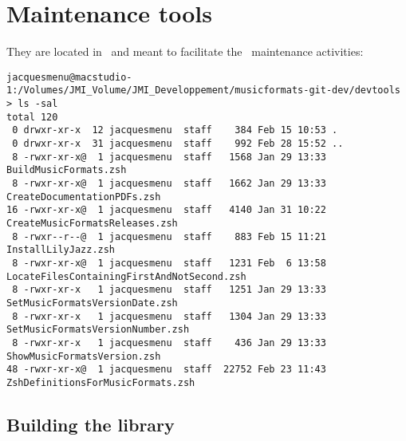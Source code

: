 



\chapter{Maintenance tools}\label{Maintenance tools}

They are located in \devtoolsFolder\ and meant to facilitate the \mf\ maintenance activities:
\begin{lstlisting}[language=Terminal]
jacquesmenu@macstudio-1:/Volumes/JMI_Volume/JMI_Developpement/musicformats-git-dev/devtools > ls -sal
total 120
 0 drwxr-xr-x  12 jacquesmenu  staff    384 Feb 15 10:53 .
 0 drwxr-xr-x  31 jacquesmenu  staff    992 Feb 28 15:52 ..
 8 -rwxr-xr-x@  1 jacquesmenu  staff   1568 Jan 29 13:33 BuildMusicFormats.zsh
 8 -rwxr-xr-x@  1 jacquesmenu  staff   1662 Jan 29 13:33 CreateDocumentationPDFs.zsh
16 -rwxr-xr-x@  1 jacquesmenu  staff   4140 Jan 31 10:22 CreateMusicFormatsReleases.zsh
 8 -rwxr--r--@  1 jacquesmenu  staff    883 Feb 15 11:21 InstallLilyJazz.zsh
 8 -rwxr-xr-x@  1 jacquesmenu  staff   1231 Feb  6 13:58 LocateFilesContainingFirstAndNotSecond.zsh
 8 -rwxr-xr-x   1 jacquesmenu  staff   1251 Jan 29 13:33 SetMusicFormatsVersionDate.zsh
 8 -rwxr-xr-x   1 jacquesmenu  staff   1304 Jan 29 13:33 SetMusicFormatsVersionNumber.zsh
 8 -rwxr-xr-x   1 jacquesmenu  staff    436 Jan 29 13:33 ShowMusicFormatsVersion.zsh
48 -rwxr-xr-x@  1 jacquesmenu  staff  22752 Feb 23 11:43 ZshDefinitionsForMusicFormats.zsh
\end{lstlisting}


\section{Building the library}

